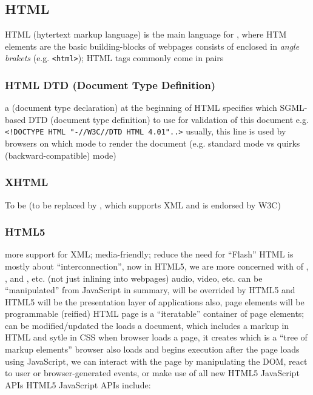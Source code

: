 \documentclass{myproc}
\begin{document}
\subsection{HTML}
\bit
\w HTML (hytertext markup language) is the main language for ,
where HTM elements are the basic building-blocks of webpages
\w {} consists of  enclosed in {\em angle brakets}
(e.g. \verb+<html>+); HTML tags commonly come in pairs
\eit
\subsubsection{HTML DTD (Document Type Definition)}
\bit
\w a  (document type declaration) at the beginning of HTML
specifies which SGML-based DTD (document type definition) to use for validation
of this document
\w e.g. \verb+<!DOCTYPE HTML "-//W3C//DTD HTML 4.01"..>+
\w usually, this line is used by browsers on which mode to render the document
(e.g. standard mode vs quirks (backward-compatible) mode)
 
\eit
\subsubsection{XHTML}
\bit
\w  To be  (to be replaced by , which supports XML
and is endorsed by W3C)
\eit
\subsubsection{HTML5}
\bit
\w more support for XML; media-friendly; reduce the need for ``Flash''
\w {}
\w HTML is mostly about ``interconnection'', now in HTML5, we are more
concerned with  of , , and
, etc. (not just inlining into webpages)
  \bit
  \w audio, video, etc. can be ``manipulated'' from JavaScript
  \eit
\w in summary,  will be overrided by HTML5 and HTML5 will
be the presentation layer of applications
\w also, page elements will be programmable (reified)
  \bit
  \w HTML page is a ``iteratable'' container of page elements; can be
  modified/updated 
  \eit
\w {}
  \bit
  \w the  loads a document, which includes a markup in HTML and
  sytle in CSS
  \w when browser loads a page, it creates 
  which is a ``tree of markup elements''
  \w browser also loads  and begins execution after the
  page loads
    \bit
    \w  using JavaScript, we can interact with the page by manipulating the
    DOM, react to user or browser-generated events, or make use of all new
    HTML5 JavaScript APIs
    \w HTML5 JavaScript APIs include: 
    \eit
  \eit
\eit
\end{document}
